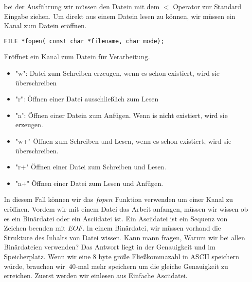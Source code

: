 \documentclass{article}[12pt]
\newenvironment{myexampleblock}[1]{%
    \tcolorbox[beamer,%
    noparskip,breakable,
    colback=White,colframe=ForestGreen,%
    colbacklower=LimeGreen!75!White,%
    title=#1]}%
    {\endtcolorbox}
\begin{document}
bei der Ausführung wir müssen den Datein mit dem $<$ Operator zur Standard Eingabe ziehen. Um direkt aus
einem Datein lesen zu können, wir müssen ein Kanal zum Datein eröffnen.
\begin{myexampleblock}{Funktion: \texttt{fopen}}
\begin{lstlisting}
FILE *fopen( const char *filename, char mode);
\end{lstlisting}
\vspace{-0.4cm}
Eröffnet ein Kanal zum Datein für Verarbeitung.
\begin{itemize} 
\itemsep0.5ex
\item "w": Datei zum Schreiben erzeugen, wenn es schon existiert, wird sie überschreiben
\item "r": Öffnen einer Datei ausschließlich zum Lesen
\item "{}a": Öffnen einer Datein zum Anfügen. Wenn is nicht existiert, wird sie erzeugen.
\item "w+" Öffnen zum Schreiben und Lesen, wenn es schon existiert, wird sie überschreiben.
\item "r+" Öffnen einer Datei zum Schreiben und Lesen.
\item "{}a+" Öffnen einer Datei zum Lesen und Anfügen.
\end{itemize}
\end{myexampleblock}  
In diesem Fall können wir das $fopen$ Funktion verwenden um einer Kanal zu eröffnen. Vordem
wir mit einem Datei das Arbeit anfangen, müssen wir wissen ob es ein Binärdatei oder ein Asciidatei
ist. Ein Asciidatei ist ein Sequenz von Zeichen beenden mit $EOF$. In einem Binärdatei, wir müssen vorhand
die Strukture des Inhalts von Datei wissen. Kann mann fragen, Warum wir bei allen Binärdateien verwenden?
Das Antwort liegt in der Genauigkeit und im Speicherplatz. Wenn wir eine 8 byte größe Fließkommazahl in 
ASCII speichern würde, brauchen wir $~40$-mal mehr speichern um die gleiche Genauigkeit zu erreichen. Zuerst 
werden wir einlesen aus Einfache Asciidatei.
\end{document}
